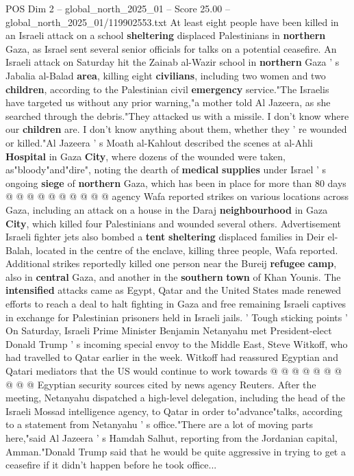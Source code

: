 \begin{textsample}{POS Dim 2 – global\_north\_2025\_01 – Score 25.00 – global\_north\_2025\_01/119902553.txt}  \label{ex:f2_pos_369}
At least eight people have been killed in an Israeli attack on a school \textbf{sheltering} displaced Palestinians in \textbf{northern} Gaza, as Israel sent several senior officials for talks on a potential ceasefire.
An Israeli attack on Saturday hit the Zainab al-Wazir school in \textbf{northern} Gaza ' s Jabalia al-Balad \textbf{area}, killing eight \textbf{civilians}, including two women and two \textbf{children}, according to the Palestinian civil \textbf{emergency} service."The Israelis have targeted us without any prior warning,"a mother told Al Jazeera, as she searched through the debris."They attacked us with a missile.
I don't know where our \textbf{children} are.
I don't know anything about them, whether they ' re wounded or killed."Al Jazeera ' s Moath al-Kahlout described the scenes at al-Ahli \textbf{Hospital} in Gaza \textbf{City}, where dozens of the wounded were taken, as"bloody"and"dire", noting the dearth of \textbf{medical} \textbf{supplies} under Israel ' s ongoing \textbf{siege} of \textbf{northern} Gaza, which has been in place for more than 80 days @ @ @ @ @ @ @ @ @ @ agency Wafa reported strikes on various locations across Gaza, including an attack on a house in the Daraj \textbf{neighbourhood} in Gaza \textbf{City}, which killed four Palestinians and wounded several others.
Advertisement Israeli fighter jets also bombed a \textbf{tent} \textbf{sheltering} displaced families in Deir el-Balah, located in the centre of the enclave, killing three people, Wafa reported.
Additional strikes reportedly killed one person near the Bureij \textbf{refugee} \textbf{camp}, also in \textbf{central} Gaza, and another in the \textbf{southern} \textbf{town} of Khan Younis.
The \textbf{intensified} attacks came as Egypt, Qatar and the United States made renewed efforts to reach a deal to halt fighting in Gaza and free remaining Israeli captives in exchange for Palestinian prisoners held in Israeli jails. ' Tough sticking points ' On Saturday, Israeli Prime Minister Benjamin Netanyahu met President-elect Donald Trump ' s incoming special envoy to the Middle East, Steve Witkoff, who had travelled to Qatar earlier in the week.
Witkoff had reassured Egyptian and Qatari mediators that the US would continue to work towards @ @ @ @ @ @ @ @ @ @ Egyptian security sources cited by news agency Reuters.
After the meeting, Netanyahu dispatched a high-level delegation, including the head of the Israeli Mossad intelligence agency, to Qatar in order to"advance"talks, according to a statement from Netanyahu ' s office."There are a lot of moving parts here,"said Al Jazeera ' s Hamdah Salhut, reporting from the Jordanian capital, Amman."Donald Trump said that he would be quite aggressive in trying to get a ceasefire if it didn't happen before he took office...

\end{textsample}

